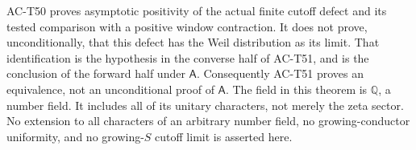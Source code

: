 \begin{remark}
AC-T50 proves asymptotic positivity of the actual finite
cutoff defect and its tested comparison with a positive
window contraction.  It does not prove, unconditionally,
that this defect has the Weil distribution as its limit.
That identification is the hypothesis in the converse
half of AC-T51, and is the conclusion of the forward
half under \(\mathsf A\).
Consequently AC-T51 proves an equivalence, not an
unconditional proof of \(\mathsf A\).
The field in this theorem is \(\mathbb Q\), a number field.
It includes all of its unitary characters, not merely the
zeta sector.  No extension to all characters of an
arbitrary number field, no growing-conductor uniformity,
and no growing-\(S\) cutoff limit is asserted here.
\end{remark}
